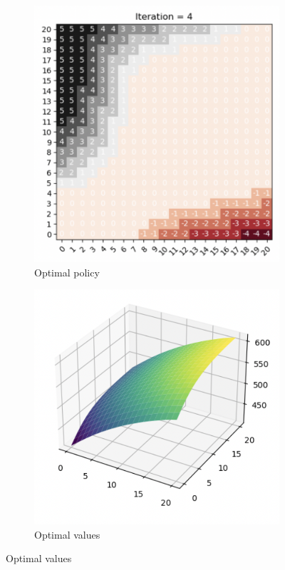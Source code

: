 \documentclass{article}
\begin{document}
\begin{enumerate}
	      
	       \begin{figure}[h]
                 \centering
                 \begin{subfigure}[b]{0.4\textwidth}
                     \centering
                     \includegraphics[width=\textwidth]{policy_vis.png}
                     \caption{Optimal policy}
                 \end{subfigure}
                 \begin{subfigure}[b]{0.4\textwidth}
                     \centering
                     \includegraphics[width=\textwidth]{value_vis.png}
                     \caption{Optimal values}
                 \end{subfigure}
        \end{figure}


\end{enumerate}
\end{document}
